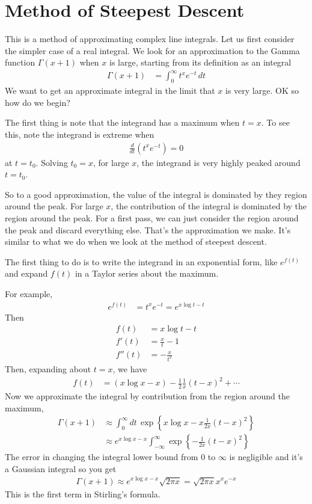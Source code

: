 \section{Method of Steepest Descent}
This is a method of approximating complex line integrals.
Let us first consider the simpler case of a real integral.
We look for an approximation to the Gamma function
$\Gamma(x + 1)$
when $x$ is large,
starting from its definition as an integral
\begin{align}
    \Gamma(x + 1)
    &=
    \int_{0}^{\infty} t^x e^{-t}\, dt
\end{align}
We want to get an approximate integral in the limit that $x$ is very large.
OK so how do we begin?

The first thing is note that the integrand has a maximum when
$t=x$.
To see this, note the integrand is extreme when
\begin{align}
    \frac{d}{dt}\left(
        t^x e^{-t}
    \right) = 0
\end{align}
at $t=t_0$.
Solving $t_0=x$,
for large $x$,
the integrand is very highly peaked around $t=t_0$.

So to a good approximation,
the value of the integral is dominated by they region around the peak.
For large $x$,
the contribution of the integral is dominated by the region around the peak.
For a first pass,
we can just consider the region around the peak and discard everything else.
That's the approximation we make.
It's similar to what we do when we look at the method of steepest descent.

The first thing to do is to write the integrand in an exponential form,
like $e^{f(t)}$
and expand $f(t)$ in a Taylor series
about the maximum.

For example,
\begin{align}
    e^{f(t)} &=
    t^{x} e^{-t}
    = e^{x \log t - t}
\end{align}
Then
\begin{align}
    f(t) &= x\log t - t\\
    f'(t) &= \frac{x}{t} - 1\\
    f''(t) &= -\frac{x}{t^2}
\end{align}
Then,
expanding about $t=x$,
we have
\begin{align}
    f(t) &=
    (x \log x - x)
    - \frac{1}{2}
    \frac{1}{x} {(t - x)}^2 + \cdots
\end{align}
Now we approximate the integral by contribution from the region around the
maximum,
\begin{align}
    \Gamma(x + 1) &\approx
    \int_{0}^{\infty} dt\,
    \exp\left\{
    x\log x - x \frac{1}{2x}{(t - x)}^2
    \right\}\\
    &\approx
    e^{x\log x - x}\int_{-\infty}^{\infty}\exp\left\{
    -\frac{1}{2x}{(t - x)}^2
    \right\}
\end{align}
The error in changing the integral lower bound from 0 to $\infty$
is negligible
and it's a Gaussian integral so you get
\begin{align}
    \Gamma(x + 1) \approx
    e^{x \log x - x}\sqrt{2\pi x} = \sqrt{2\pi x} x^x e^{-x}
\end{align}
This is the first term in Stirling's formula.

